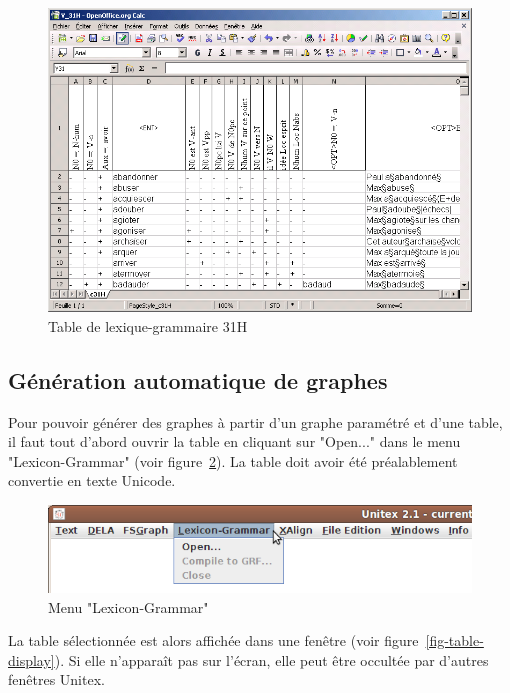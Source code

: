 \begin{figure}[!ht]
\begin{center}
\includegraphics[width=15cm]{resources/img/fig8-4.png}
\caption{Table de lexique-grammaire 31H\label{fig-table-31H}}
\end{center}
\end{figure}


\subsection{Génération automatique de graphes}
Pour pouvoir générer des graphes à partir d’un graphe paramétré et d’une table, il faut
tout d’abord ouvrir la table en cliquant sur "Open..." dans le menu "Lexicon-Grammar" (voir
figure~\ref{fig-lexicon-grammar-menu}). La table doit avoir été préalablement convertie en texte
Unicode.

\begin{figure}[!ht]
\begin{center}
\includegraphics[width=12cm]{resources/img/fig8-5.png}
\caption{Menu "Lexicon-Grammar"\label{fig-lexicon-grammar-menu}}
\end{center}
\end{figure}

\bigskip
\noindent La table sélectionnée est alors affichée dans une fenêtre (voir
figure~\ref{fig-table-display}). Si elle n'apparaît pas sur l'écran, elle peut être occultée par
d'autres fenêtres Unitex.

